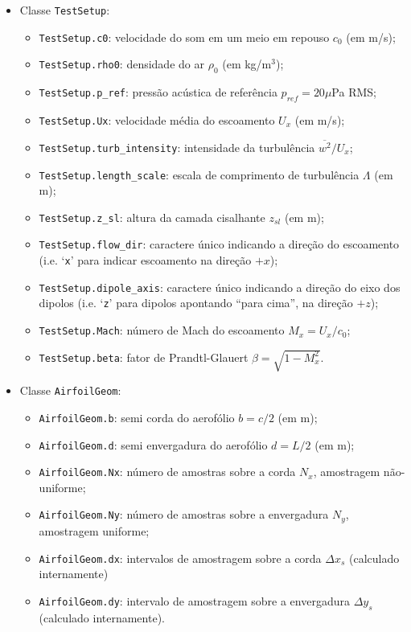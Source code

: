 \documentclass[a4paper, 11pt, twoside]{article}
\begin{document}
\begin{itemize}
	\item Classe \verb|TestSetup|:
	\begin{itemize}
		\item \verb|TestSetup.c0|: velocidade do som em um meio em repouso $c_0$ (em m/s);
		\item \verb|TestSetup.rho0|: densidade do ar $\rho_0$ (em kg/m$^3$);
		\item \verb|TestSetup.p_ref|: pressão acústica de referência $p_{ref} = 20 \mu$Pa RMS;
		\item \verb|TestSetup.Ux|: velocidade média do escoamento $U_x$ (em m/s);
		\item \verb|TestSetup.turb_intensity|: intensidade da turbulência $\overline{w^2}/U_x$;
		\item \verb|TestSetup.length_scale|: escala de comprimento de turbulência $\Lambda$ (em m);
		\item \verb|TestSetup.z_sl|: altura da camada cisalhante $z_{sl}$ (em m);
		\item \verb|TestSetup.flow_dir|: caractere único indicando a direção do escoamento (i.e. `\verb|x|' para indicar escoamento na direção $+x$);
		\item \verb|TestSetup.dipole_axis|: caractere único indicando a direção do eixo dos dipolos (i.e. `\verb|z|' para dipolos apontando ``para cima'', na direção $+z$);
		\item \verb|TestSetup.Mach|: número de Mach do escoamento $M_x = U_x/c_0$;
		\item \verb|TestSetup.beta|: fator de Prandtl-Glauert $\beta = \sqrt{1-M_x^2}$.
	\end{itemize}
	
	\item Classe \verb|AirfoilGeom|:
	\begin{itemize}
		\item \verb|AirfoilGeom.b|: semi corda do aerofólio $b = c/2$ (em m);
		\item \verb|AirfoilGeom.d|: semi envergadura do aerofólio $d = L/2$ (em m);
		\item \verb|AirfoilGeom.Nx|: número de amostras sobre a corda $N_x$, amostragem não-uniforme;
		\item \verb|AirfoilGeom.Ny|: número de amostras sobre a envergadura $N_y$, amostragem uniforme;
		\item \verb|AirfoilGeom.dx|: intervalos de amostragem sobre a corda $\Delta x_s$  (calculado internamente)
		\item \verb|AirfoilGeom.dy|: intervalo de amostragem sobre a envergadura $\Delta y_s$  (calculado internamente).
	\end{itemize}
	

\end{itemize}
\end{document}
